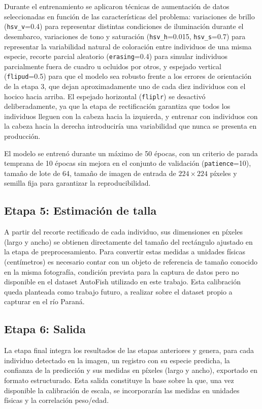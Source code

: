 \documentclass[conference]{IEEEtran}
\begin{document}
Durante el entrenamiento se aplicaron técnicas de aumentación de datos seleccionadas en función de las características del problema: variaciones de brillo (\texttt{hsv\_v}=0.4) para representar distintas condiciones de iluminación durante el desembarco, variaciones de tono y saturación (\texttt{hsv\_h}=0.015, \texttt{hsv\_s}=0.7) para representar la variabilidad natural de coloración entre individuos de una misma especie, recorte parcial aleatorio (\texttt{erasing}=0.4) para simular individuos parcialmente fuera de cuadro u ocluidos por otros, y espejado vertical (\texttt{flipud}=0.5) para que el modelo sea robusto frente a los errores de orientación de la etapa 3, que dejan aproximadamente uno de cada diez individuos con el hocico hacia arriba. El espejado horizontal (\texttt{fliplr}) se desactivó deliberadamente, ya que la etapa de rectificación garantiza que todos los individuos lleguen con la cabeza hacia la izquierda, y entrenar con individuos con la cabeza hacia la derecha introduciría una variabilidad que nunca se presenta en producción.

El modelo se entrenó durante un máximo de 50 épocas, con un criterio de parada temprana de 10 épocas sin mejora en el conjunto de validación (\texttt{patience}=10), tamaño de lote de 64, tamaño de imagen de entrada de $224\times224$ píxeles y semilla fija para garantizar la reproducibilidad.

\subsection{Etapa 5: Estimación de talla}
A partir del recorte rectificado de cada individuo, sus dimensiones en píxeles (largo y ancho) se obtienen directamente del tamaño del rectángulo ajustado en la etapa de preprocesamiento. Para convertir estas medidas a unidades físicas (centímetros) es necesario contar con un objeto de referencia de tamaño conocido en la misma fotografía, condición prevista para la captura de datos pero no disponible en el dataset AutoFish utilizado en este trabajo. Esta calibración queda planteada como trabajo futuro, a realizar sobre el dataset propio a capturar en el río Paraná.

\subsection{Etapa 6: Salida}
La etapa final integra los resultados de las etapas anteriores y genera, para cada individuo detectado en la imagen, un registro con su especie predicha, la confianza de la predicción y sus medidas en píxeles (largo y ancho), exportado en formato estructurado. Esta salida constituye la base sobre la que, una vez disponible la calibración de escala, se incorporarán las medidas en unidades físicas y la correlación peso/edad.
\end{document}
